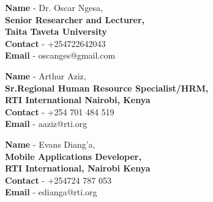 \documentclass[9pt]{developercv} %
\begin{document}
\begin{minipage}[t]{0.3\textwidth}
	\vspace{-\baselineskip} %
	
	
	\textbf{Name} - Dr. Oscar Ngesa,\\
	\textbf{Senior Researcher and Lecturer,}\\
		\textbf{Taita Taveta University  }\\
	\textbf{Contact} -  +254722642043\\
	\textbf{Email} - oscanges@gmail.com
\end{minipage}
\hfill
\begin{minipage}[t]{0.3\textwidth}
	\vspace{-\baselineskip} %
	
	
	\textbf{Name} - Arthur Aziz,\\
	\textbf{Sr.Regional Human Resource Specialist/HRM,}\\
	\textbf{RTI International
Nairobi, Kenya
}\\
	\textbf{Contact} - +254 701 484 519\\
	\textbf{Email} - aaziz@rti.org
\end{minipage}
\hfill
\begin{minipage}[t]{0.3\textwidth}
	\vspace{-\baselineskip} %
	
	
	\textbf{Name} - Evans Diang’a,\\
	\textbf{Mobile Applications Developer,}\\
	\textbf{RTI International, Nairobi Kenya}\\
	\textbf{Contact} - +254724 787 053\\
	\textbf{Email} - edianga@rti.org
\end{minipage}
\end{document}
